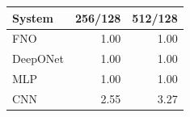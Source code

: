 \begin{tabular}{lrr}
\toprule
System & 256/128 & 512/128 \\
\midrule
FNO & 1.00 & 1.00 \\
DeepONet & 1.00 & 1.00 \\
MLP & 1.00 & 1.00 \\
CNN & 2.55 & 3.27 \\
\bottomrule
\end{tabular}
